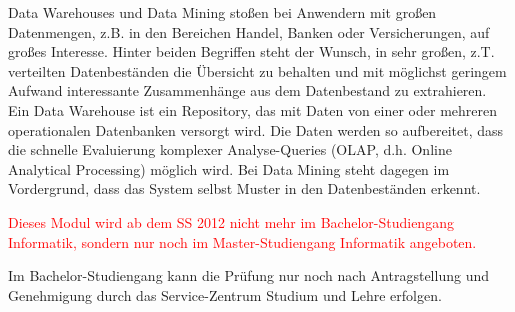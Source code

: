 \begin{module}
\begin{learningoutcomes}
\end{learningoutcomes}

\begin{content}
Data Warehouses und Data Mining stoßen bei Anwendern mit großen Datenmengen, z.B. in den Bereichen Handel, Banken oder Versicherungen, auf großes Interesse. Hinter beiden Begriffen steht der Wunsch, in sehr großen, z.T. verteilten Datenbeständen die Übersicht zu behalten und mit möglichst geringem Aufwand interessante Zusammenhänge aus dem Datenbestand zu extrahieren. Ein Data Warehouse ist ein Repository, das mit Daten von einer oder mehreren operationalen Datenbanken versorgt wird. Die Daten werden so aufbereitet, dass die schnelle Evaluierung komplexer Analyse-Queries (OLAP, d.h. Online Analytical Processing) möglich wird. Bei Data Mining steht dagegen im Vordergrund, dass das System selbst Muster in den Datenbeständen erkennt.


\end{content}

\begin{remarks}\textcolor{red}{Dieses Modul wird ab dem SS 2012 nicht mehr im Bachelor-Studiengang Informatik, sondern nur noch im Master-Studiengang Informatik angeboten.}

 

Im Bachelor-Studiengang kann die Prüfung nur noch nach Antragstellung und Genehmigung durch das Service-Zentrum Studium und Lehre erfolgen.

\end{remarks}

\end{module}

